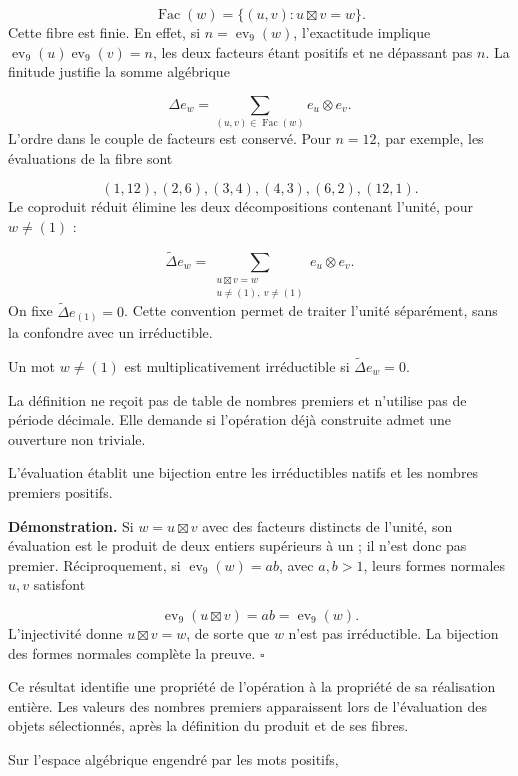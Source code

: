 \[
\operatorname{Fac}(w)=\{(u,v):u\boxtimes v=w\}.
\]
Cette fibre est finie. En effet, si $n=\operatorname{ev}_9(w)$, l'exactitude implique $\operatorname{ev}_9(u)\operatorname{ev}_9(v)=n$, les deux facteurs étant positifs et ne dépassant pas $n$. La finitude justifie la somme algébrique

\[
\Delta e_w=\sum_{(u,v)\in\operatorname{Fac}(w)}e_u\otimes e_v.
\]
L’ordre dans le couple de facteurs est conservé. Pour $n=12$, par exemple, les évaluations de la fibre sont

\[
(1,12),(2,6),(3,4),(4,3),(6,2),(12,1).
\]
Le coproduit réduit élimine les deux décompositions contenant l'unité, pour $w\ne(1)$ :

\[
\widetilde\Delta e_w
=\sum_{\substack{u\boxtimes v=w\\u\ne(1),\ v\ne(1)}}e_u\otimes e_v.
\]
On fixe $\widetilde\Delta e_{(1)}=0$. Cette convention permet de traiter l'unité séparément, sans la confondre avec un irréductible.

Un mot $w\ne(1)$ est multiplicativement irréductible si $\widetilde\Delta e_w=0$.

La définition ne reçoit pas de table de nombres premiers et n'utilise pas de période décimale. Elle demande si l'opération déjà construite admet une ouverture non triviale.

L'évaluation établit une bijection entre les irréductibles natifs et les nombres premiers positifs.

\textbf{Démonstration.} Si $w=u\boxtimes v$ avec des facteurs distincts de l’unité, son évaluation est le produit de deux entiers supérieurs à un ; il n’est donc pas premier. Réciproquement, si $\operatorname{ev}_9(w)=ab$, avec $a,b>1$, leurs formes normales $u,v$ satisfont

\[
\operatorname{ev}_9(u\boxtimes v)=ab=\operatorname{ev}_9(w).
\]
L'injectivité donne $u\boxtimes v=w$, de sorte que $w$ n'est pas irréductible. La bijection des formes normales complète la preuve. \hfill\(\square\)

Ce résultat identifie une propriété de l'opération à la propriété de sa réalisation entière. Les valeurs des nombres premiers apparaissent lors de l'évaluation des objets sélectionnés, après la définition du produit et de ses fibres.

Sur l’espace algébrique engendré par les mots positifs,

